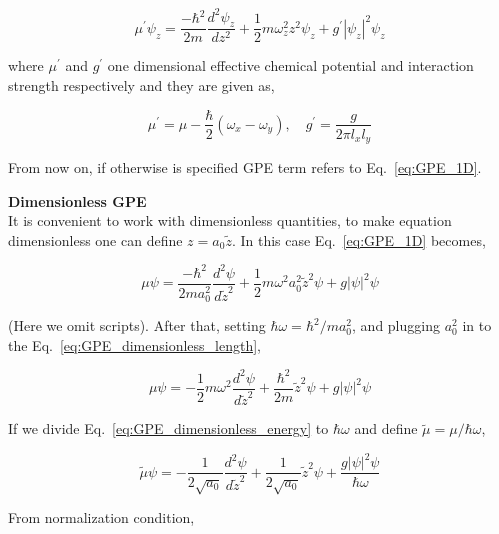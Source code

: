 \documentclass[a4paper,times,12pt]{article}
\begin{document}
\begin{equation}
\label{eq:GPE_1D}
\mu^{\prime}\psi_z = \frac{-\hbar^2}{2m}\frac{d^2\psi_z}{dz^2} + \frac{1}{2}m\omega_z^2 z^2\psi_z + g^{\prime}|\psi_z|^2\psi_z 
\end{equation}

\noindent where $\mu^{\prime}$ and $g^{\prime}$ one dimensional effective chemical potential and interaction strength respectively and they are given as,

\begin{equation}
\label{eq:GPE_1D_chem_inter}
\mu^{\prime} = \mu - \frac{\hbar}{2}(\omega_x - \omega_y), \quad g^{\prime} = \frac{g}{2\pi l_x l_y}
\end{equation}

\noindent From now on, if otherwise is specified GPE term refers to Eq.~\ref{eq:GPE_1D}. 

\textbf{Dimensionless GPE}\\

It is convenient to work with dimensionless quantities, to make equation dimensionless one can define $z = a_0\widetilde{z}$. In this case Eq.~\ref{eq:GPE_1D} becomes,

\begin{equation}
\label{eq:GPE_dimensionless_length}
\mu\psi = \frac{-\hbar^2}{2ma_0^2}\frac{d^2\psi}{d\widetilde{z}^2} + \frac{1}{2}m\omega^2 a_0^2 \widetilde{z}^2\psi + g|\psi|^2\psi
\end{equation}

(Here we omit scripts). After that, setting $\hbar\omega = {\hbar^2}/{m a_0^2}$, and plugging $a_0^2$ in to the Eq.~\ref{eq:GPE_dimensionless_length},

\begin{equation}
\label{eq:GPE_dimensionless_energy}
\mu\psi = -\frac{1}{2}m\omega^2\frac{d^2\psi}{d\widetilde{z}^2} + \frac{\hbar^2}{2m}\widetilde{z}^2\psi + g|\psi|^2\psi
\end{equation}

If we divide Eq.~\ref{eq:GPE_dimensionless_energy} to $\hbar\omega$ and define $\widetilde{\mu} = \mu/\hbar\omega$,

\begin{equation}
\label{eq:GPE_dimensionless_without_g}
\widetilde{\mu} \psi = -\frac{1}{2\sqrt{a_0}}\frac{d^2\psi}{d\widetilde{z}^2} + \frac{1}{2\sqrt{a_0}}\widetilde{z}^2\psi + \frac{g|\psi|^2\psi}{\hbar\omega}
\end{equation}

From normalization condition,
\end{document}
